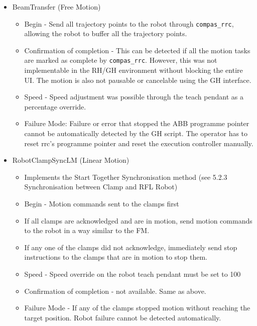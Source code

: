 \begin{itemize}
\item BeamTransfer (Free Motion)
    \begin{itemize}
        \item Begin - Send all trajectory points to the robot through \verb|compas_rrc|, allowing the robot to buffer all the trajectory points. 
        \item Confirmation of completion  -  This can be detected if all the motion tasks are marked as complete by \verb|compas_rrc|. However, this was not implementable in the RH/GH environment without blocking the entire UI. The motion is also not pausable or cancelable using the GH interface.
        \item Speed - Speed adjustment was possible through the teach pendant as a percentage override.
        \item Failure Mode: Failure or error that stopped the ABB programme pointer cannot be automatically detected by the GH script. The operator has to reset rrc’s programme pointer and reset the execution controller manually.
    \end{itemize}
    \item RobotClampSyncLM (Linear Motion)
    \begin{itemize}
        \item Implements the Start Together Synchronisation method (see 5.2.3 Synchronisation between Clamp and RFL Robot)
        \item Begin - Motion commands sent to the clamps first
    \end{itemize}
    \begin{itemize}
        \item If all clamps are acknowledged and are in motion, send motion commands to the robot in a way similar to the FM.
        \item If any one of the clamps did not acknowledge, immediately send stop instructions to the clamps that are in motion to stop them. 
    \end{itemize}
    \begin{itemize}
        \item Speed - Speed override on the robot teach pendant must be set to 100%
        \item Confirmation of completion - not available. Same as above.
        \item Failure Mode - If any of the clamps stopped motion without reaching the target position. Robot failure cannot be detected automatically.
    \end{itemize}
\end{itemize}


